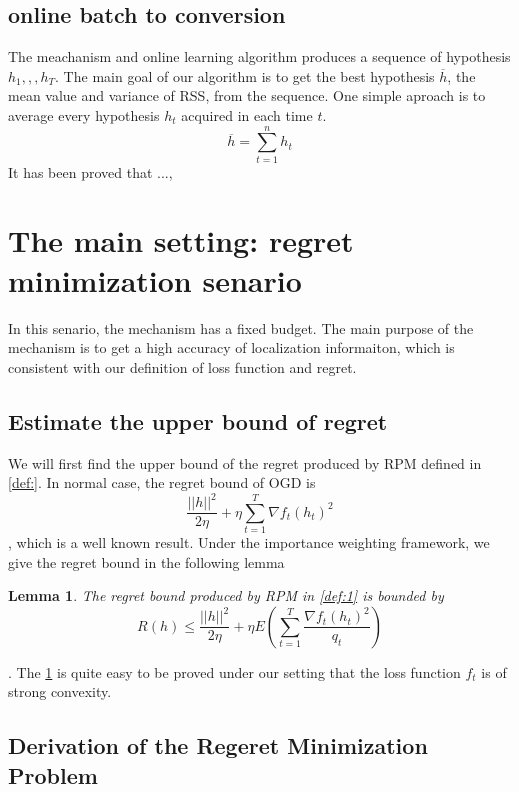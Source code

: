 \documentclass[10pt,conference,compsocconf,letterpaper]{IEEEtran}
\newtheorem{Lemma}{Lemma}
\begin{document}
\subsection{online batch to conversion}
The meachanism and online learning algorithm produces a sequence of hypothesis $h_1,,,h_T$. The main goal of our algorithm is to get the best hypothesis $\overline{h}$, the mean value and variance of RSS, from the sequence. One simple aproach is to average every hypothesis $h_t$ acquired in each time $t$.
\begin{equation}
\overline{h}=\sum_{t=1}^n h_t
\end{equation}
It has been proved that ...,

\section{The main setting: regret minimization senario}\label{mainsolution}
In this senario, the mechanism has a fixed budget. The main purpose of the mechanism is to get a high accuracy of localization informaiton, which is consistent with our definition of loss function and regret. 
\subsection{Estimate the upper bound of regret}
We will first find the upper bound of the regret produced by RPM defined in \ref{def:}. In normal case, the regret bound of OGD is 
\begin{equation}
\frac{||h||^2}{2\eta}+\eta \sum_{t=1}^T\nabla f_t(h_t)^2
\end{equation}
, which is a well known result. Under the importance weighting framework, we give the regret bound in the following lemma
\begin{Lemma}\label{lemma:reg}
The regret bound produced by RPM in \ref{def:1} is bounded by
\begin{equation}
R(h)\leq \frac{||h||^2}{2\eta}+\eta E(\sum_{t=1}^T\frac{\nabla f_t(h_t)^2}{q_t})
\end{equation}
\end{Lemma}
. The \ref{lemma:reg} is quite easy to be proved under our setting that the loss function $f_t$ is of strong convexity.

\subsection{Derivation of the Regeret Minimization Problem}
\end{document}
